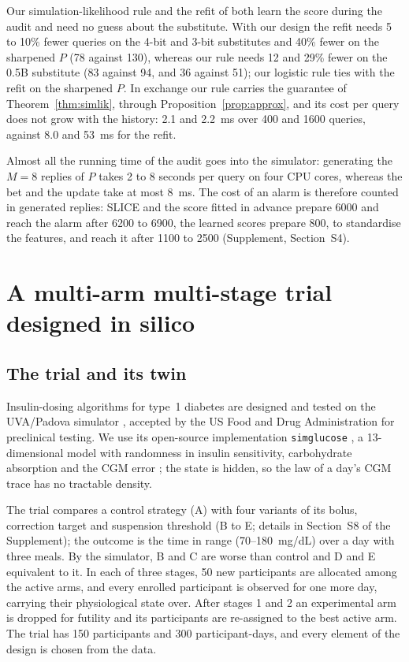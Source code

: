 \documentclass[12pt]{article}
\theoremstyle{remark}
\begin{document}
Our simulation-likelihood rule and the refit of \citet{forre2026anytime} both
learn the score during the audit and need no guess about the substitute. With
our design the refit needs 5 to 10\% fewer queries on the 4-bit and 3-bit
substitutes and 40\% fewer on the sharpened $P$ (78 against 130), whereas our
rule needs 12 and 29\% fewer on the 0.5B substitute (83 against 94, and 36
against 51); our logistic rule ties with the refit on the sharpened $P$. In exchange our rule carries the guarantee of Theorem~\ref{thm:simlik}, through Proposition~\ref{prop:approx}, and its cost per query does not grow with the history: 2.1 and 2.2~ms over 400 and 1600 queries, against 8.0 and 53~ms for the refit.

Almost all the running time of the audit goes into the simulator: generating
the $M = 8$ replies of $P$ takes 2 to 8 seconds per query on four CPU cores,
whereas the bet and the update take at most 8~ms. The cost of an alarm is therefore counted in generated replies: SLICE and the score fitted in advance prepare 6000 and reach the alarm after 6200 to 6900, the learned scores prepare 800, to standardise the features, and reach it after 1100 to 2500 (Supplement, Section~S4).

\section{A multi-arm multi-stage trial designed in silico}\label{sec:trial}

\subsection{The trial and its twin}\label{sec:application}

Insulin-dosing algorithms for type~1 diabetes are designed and tested on the
UVA/Padova simulator \citep{dallaman2007meal,kovatchev2009insilico,dallaman2014uva},
accepted by the US Food and Drug Administration for preclinical testing. We use
its open-source implementation \texttt{simglucose} \citep{xie2018simglucose},
a 13-dimensional model with randomness in insulin sensitivity, carbohydrate
absorption and the CGM error \citep{breton2008analysis}; the state is hidden,
so the law of a day's CGM trace has no tractable density.

The trial compares a control strategy (A) with four variants of its bolus,
correction target and suspension threshold (B to E; details in
Section~S8 of the Supplement); the outcome is the time in range (70--180~mg/dL)
over a day with three meals. By the simulator, B and C are worse than control
and D and E equivalent to it. In each of three stages, 50 new participants are
allocated among the active arms, and every enrolled participant is observed for
one more day, carrying their physiological state over. After stages 1 and 2 an
experimental arm is dropped for futility and its participants are re-assigned
to the best active arm. The trial has 150 participants and 300
participant-days, and every element of the design is chosen from the data.
\end{document}
